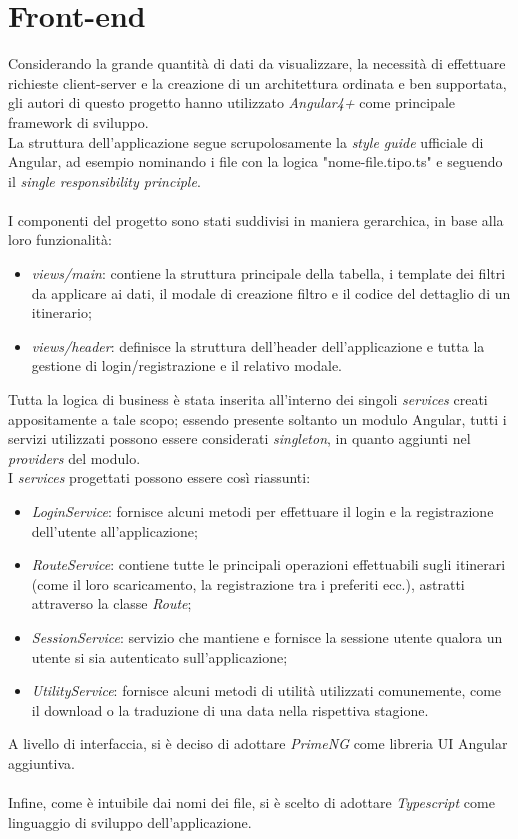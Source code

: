 \documentclass[11pt]{report}
\begin{document}
\section{Front-end}
Considerando la grande quantità di dati da visualizzare, la necessità di effettuare richieste client-server e la creazione di un architettura ordinata e ben supportata, gli autori di questo progetto hanno utilizzato \textit{Angular4+} come principale framework di sviluppo.
\\La struttura dell'applicazione segue scrupolosamente la \textit{style guide} ufficiale di Angular, ad esempio nominando i file con la logica "nome-file.tipo.ts" e seguendo il \textit{single responsibility principle}.
\\\\I componenti del progetto sono stati suddivisi in maniera gerarchica, in base alla loro funzionalità:
\begin{itemize}
	\item \textit{views/main}: contiene la struttura principale della tabella, i template dei filtri da applicare ai dati, il modale di creazione filtro e il codice del dettaglio di un itinerario;
	\item \textit{views/header}: definisce la struttura dell'header dell'applicazione e tutta la gestione di login/registrazione e il relativo modale.
\end{itemize}
Tutta la logica di business è stata inserita all'interno dei singoli \textit{services} creati appositamente a tale scopo; essendo presente soltanto un modulo Angular, tutti i servizi utilizzati possono essere considerati \textit{singleton}, in quanto aggiunti nel \textit{providers} del modulo.
\\I \textit{services} progettati possono essere così riassunti:
\begin{itemize}
	\item \textit{LoginService}: fornisce alcuni metodi per effettuare il login e la registrazione dell'utente all'applicazione;
	\item \textit{RouteService}: contiene tutte le principali operazioni effettuabili sugli itinerari (come il loro scaricamento, la registrazione tra i preferiti ecc.), astratti attraverso la classe \textit{Route};
	\item \textit{SessionService}: servizio che mantiene e fornisce la sessione utente qualora un utente si sia autenticato sull'applicazione;
	\item \textit{UtilityService}: fornisce alcuni metodi di utilità utilizzati comunemente, come il download o la traduzione di una data nella rispettiva stagione.
\end{itemize}
A livello di interfaccia, si è deciso di adottare \textit{PrimeNG} come libreria UI Angular aggiuntiva.
\\\\Infine, come è intuibile dai nomi dei file, si è scelto di adottare \textit{Typescript} come linguaggio di sviluppo dell'applicazione.
\pagebreak
\end{document}
